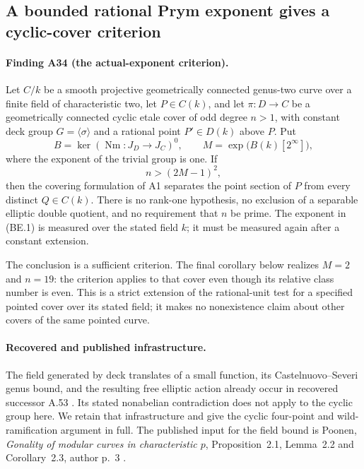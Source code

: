 \subsection{A bounded rational Prym exponent gives a cyclic-cover criterion}
\label{sec:bounded-prym-exponent}

\paragraph{Finding A34 (the actual-exponent criterion).}
Let $C/k$ be a smooth projective geometrically connected genus-two
curve over a finite field of characteristic two, let $P\in C(k)$,
and let $\pi:D\to C$ be a geometrically connected cyclic etale cover
of odd degree $n>1$, with constant deck group
$G=\langle\sigma\rangle$ and a rational point $P'\in D(k)$ above $P$.
Put
\[
 B=\ker(\operatorname{Nm}:J_D\longrightarrow J_C)^0,
 \qquad M=\exp\bigl(B(k)[2^\infty]\bigr),
 \tag{BE.1}
\]
where the exponent of the trivial group is one. If
\[
                         n>(2M-1)^2,
 \tag{BE.2}
\]
then the covering formulation of A1 separates the point section
of $P$ from every distinct $Q\in C(k)$.
There is no rank-one hypothesis, no exclusion of a separable
elliptic double quotient, and no requirement that $n$ be prime.
The exponent in (BE.1) is measured over the stated field $k$;
it must be measured again after a constant extension.

The conclusion is a sufficient criterion. The final corollary
below realizes $M=2$ and $n=19$: the criterion applies to that
cover even though its relative class number is even. This is
a strict extension of the rational-unit test for a specified
pointed cover over its stated field; it makes no nonexistence
claim about other covers of the same pointed curve.

\paragraph{Recovered and published infrastructure.}
The field generated by deck translates of a small function, its
Castelnuovo--Severi genus bound, and the resulting free elliptic
action already occur in recovered successor A.53
\cite[A.53]{ASrun}. Its stated nonabelian contradiction does not
apply to the cyclic group here. We retain that infrastructure and
give the cyclic four-point and wild-ramification argument in full.
The published input for the field bound is Poonen,
\emph{Gonality of modular curves in characteristic $p$},
Proposition~2.1, Lemma~2.2 and Corollary~2.3, author p.~3
\cite{Poonen2007Gonality}.

